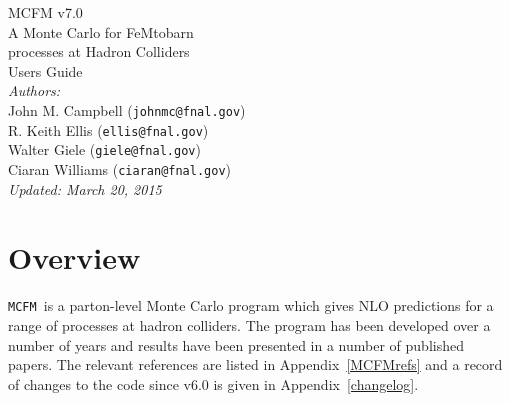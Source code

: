 \documentclass[12pt]{article}
\begin{document}
\def\GeV{\mbox{GeV}}
\def\cteqten{\mbox{1007.2241 [hep-ph]}}
\def\cteqsixsixm{\mbox{0802.0007 [hep-ph]}}
\def\cteqsixonem{\mbox{hep-ph/0303013}}
\def\cteqsix{\mbox{hep-ph/0201195}}
\def\cteqfive{\mbox{hep-ph/9903282}}
\def\cteqfour{\mbox{hep-ph/9606399}}
\def\cteqthree{\mbox{MSU-HEP/41024}}
\def\mrstff{\mbox{hep-ph/0603143}}
\def\mrstohtwo{\mbox{hep-ph/0211080}}
\def\mrstohtwofirst{\mbox{hep-ph/0201127}}
\def\mrstohone{\mbox{hep-ph/0110215}}
\def\mrsninenine{\mbox{hep-ph/9907231}}
\def\mrsnineeight{\mbox{hep-ph/9803445}}
\def\mrsninesix{\mbox{PLB387 (1996) 419}}
\def\mrsninefive{\mbox{PLB354 (1995) 155}}
\def\hmrs{\mbox{Durham DTP-90-04}}
\def\mstwoheight{\mbox{0901.0002 [hep-ph]}}
\def\MCFM{{\tt MCFM }}
\def\pow{{\lower.12ex\hbox{\texttt{\char`\^}}}}

\thispagestyle{empty}
\vspace*{3cm}
\begin{center}
{\Huge MCFM v7.0} \\
\vspace*{0.5cm}
\Large{A Monte Carlo for FeMtobarn} \\
\Large{processes at Hadron Colliders} \\
\vspace*{1.5cm}
{\huge Users Guide} \\
\vspace*{4cm}
{\it Authors:} \\
\vspace*{0.2cm}
John M. Campbell ({\tt johnmc@fnal.gov}) \\
R. Keith Ellis ({\tt ellis@fnal.gov}) \\
Walter Giele ({\tt giele@fnal.gov}) \\
Ciaran Williams ({\tt ciaran@fnal.gov}) \\
\vspace*{1.5cm}
{\it \small Updated: March 20, 2015}
\end{center}

\newpage

\tableofcontents

\section{Overview}

\MCFM is a parton-level Monte Carlo program which gives NLO predictions
for a range of processes at hadron colliders. The program has been
developed over a number of years and results have been presented in
a number of published papers. The relevant references are listed
in Appendix~\ref{MCFMrefs} and a record of changes to the code
since v6.0 is given in Appendix~\ref{changelog}.
\end{document}
